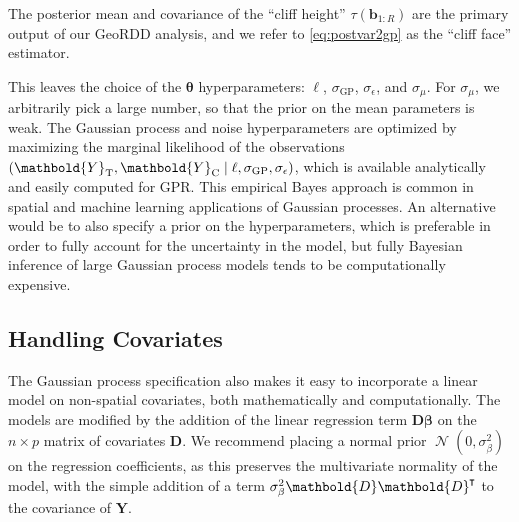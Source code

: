 \documentclass[letter]{article}
\DeclarePairedDelimiter{\parenthesis}{\lparen}{\rparen}
\newcommand{\del}[1]{\parenthesis*{#1}}
\let\Pr\relax
\DeclareMathOperator{\Pr}{\mathbb{P}}
\DeclareMathOperator{\normal}{\mathcal{N}}
\newcommand*{\trans}{^{\mkern-1.5mu\intercal}}
\newcommand{\treat}{\mathrm{T}}
\newcommand{\ctrol}{\mathrm{C}}
\newcommand{\sigmaf}{\sigma_{\mathrm{GP}}}
\newcommand{\sigman}{\sigma_{\epsilon}}
\newcommand{\sigmabeta}{\sigma_{\beta}}
\newcommand{\sigmamu}{\sigma_{\mu}}
\newcommand{\Yvec}{\mathbold{Y}}
\newcommand{\yt}{\Yvec_{\treat}}
\newcommand{\yc}{\Yvec_{\ctrol}}
\newcommand{\betavec}{\mathbold{\beta}}
\newcommand{\sentinel}{\bm{b}}
\newcommand{\numsent}{R}
\newcommand{\sentinels}{\sentinel_{1:\numsent}}
\newcommand{\hyperparam}{\bm{\theta}}
\newcommand{\Dmat}{\mathbold{D}}
\begin{document}
The posterior mean and covariance of the ``cliff height'' \(\tau(\sentinels)\) are the primary output of our GeoRDD analysis, and we refer to \eqref{eq:postvar2gp} as the ``cliff face'' estimator.
    


    	This leaves the choice of the \(\hyperparam\) hyperparameters: \(\ell\), \(\sigmaf\), \(\sigman\), and \(\sigmamu\).
For \(\sigmamu\), we arbitrarily pick a large number, so that the prior on the mean parameters is weak.
The Gaussian process and noise hyperparameters are optimized by maximizing the marginal likelihood of the observations \(\Pr\del{\yt, \yc \mid \ell, \sigmaf, \sigman}\), which is available analytically and easily computed for GPR.
This empirical Bayes approach is common in spatial and machine learning applications of Gaussian processes.
An alternative would be to also specify a prior on the hyperparameters, which is preferable in order to fully account for the uncertainty in the model, but fully Bayesian inference of large Gaussian process models tends to be computationally expensive.
    


    	\hypertarget{handling-covariates}{%
\subsection{Handling Covariates}\label{handling-covariates}}

\label{sec:covariates}

The Gaussian process specification also makes it easy to incorporate a linear model on non-spatial covariates, both mathematically and computationally.
The models are modified by the addition of the linear regression term \(\Dmat \betavec\) on the \(n \times p\) matrix of covariates \(\Dmat\).
We recommend placing a normal prior \(\normal(0,\sigmabeta^2)\) on the regression coefficients, as this preserves the multivariate normality of the model, with the simple addition of a term \(\sigma_\beta^2 \Dmat \Dmat\trans\) to the covariance of \(\Yvec\).
\end{document}
